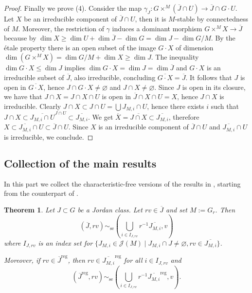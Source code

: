 \documentclass[12pt]{amsart}
\newtheorem{Theorem}{Theorem}[section]
\theoremstyle{definition}
\theoremstyle{remark}
\newcommand{\reg}{{\operatorname{reg}}}
\newcommand{\se}{\operatorname{se}}
\begin{document}
\begin{proof}
Finally we prove (4).
 Consider the map $\gamma_J \colon G \times^M (\overline{J} \cap U ) \to \overline{J} \cap G \cdot U$.
Let $X$ be an irreducible component of $\overline{J} \cap U$, then it is $M$-stable by connectedness of $M$.
Moreover, the restriction of $\gamma$ induces a dominant morphism $G \times^M X \to \overline{J}$ because
by \cite[I, 7.1]{Hartshorne} $\dim X \geq \dim U + \dim \overline{ J} - \dim G = \dim J - \dim G/M$.
By the \'etale property there is an open subset of the image $G \cdot X$ of dimension $\dim (G \times^M X) = \dim G/M + \dim X \geq \dim J$.
The inequality $\dim G \cdot X \leq \dim J$ implies 
$\dim G \cdot X = \dim J = \dim \overline{J}$ and $G \cdot X$ is an irreducible subset of $\overline{J}$, also irreducible, concluding $\overline{G \cdot X} = \overline{J}$.
It follows that $J$ is open in $\overline{G \cdot X}$, hence $J \cap G \cdot X \neq \varnothing$ and $J \cap X \neq \varnothing$.
Since $J$ is open in its closure, we have that $J \cap X = J \cap X \cap U$ is open in $\overline{J} \cap X \cap U = X$, hence $J \cap X$ is irreducible.
Clearly $J \cap X \subset J \cap U = \bigcup J_{M,i} \cap U$, hence there exists $i$ such that
$J \cap X \subset \overline{J_{M,i} \cap U}^{J \cap U} \subset \overline{J_{M,i}}$.
We get $\overline{X} = \overline{J \cap X} \subset \overline{J_{M,i}}$, therefore 
$X \subset \overline{J_{M,i}} \cap U \subset \overline{J} \cap U$.
Since $X$ is an irreducible component of $\overline{J} \cap U$ 
and $\overline{J_{M,i}} \cap U$ is irreducible, we conclude.
\end{proof}

\subsection{Collection of the main results}
In this part we collect the characteristic-free versions of the  results in \cite[\S 4]{ACE}, starting from the counterpart of \cite[Proposition 4.3]{ACE}.

\begin{Theorem}\label{th_ACE}
Let $J \subset G$ be a Jordan class.
Let $rv \in \overline{J}$ and set $M := G_r$.
Then 
\begin{equation} \label{eq_clos}
(\overline{J}, rv) \sim_{\se} \left( \bigcup_{i \in I_{J, rv}} r^{-1} \overline{J_{M,i}}, v \right)
\end{equation}
where $I_{J, rv}$ is an index set for $\{ J_{M,i} \in \mathcal{J}(M) \mid J_{M,i} \cap J \neq \varnothing, rv \in \overline{J_{M,i}} \}$.

Moreover, if $rv \in \overline{J}^\reg$, then $rv \in \overline{J_{M,i}}^\reg$ for all $i \in I_{J, rv}$ and  
\begin{equation}  \label{eq_reg}
(\overline{J}^\reg, rv) \sim_{\se} \left( \bigcup_{i \in I_{J, rv}} r^{-1} \overline{J_{M,i}}^\reg, v \right).
\end{equation}
\end{Theorem}
\end{document}
